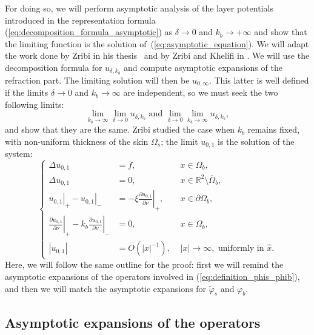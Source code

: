 \documentclass[final]{siamltex}
\numberwithin{equation}{section}
\numberwithin{figure}{section}
\numberwithin{table}{section}
\begin{document}
For doing so, we will perform asymptotic analysis of the layer
potentials introduced in the representation formula
(\ref{eq:decomposition_formula_asymptotic}) as $\delta \rightarrow
0$ and $k_b\rightarrow +\infty$ and show that the limiting
function is the solution of~(\ref{eq:asymptotic_equation}). We
will adapt the work done by Zribi in his thesis~\cite{zribilayer}
and by Zribi and Khelifi in \cite{khelifizribi}. We will use the
decomposition formula for $u_{\delta,k_{b}}$ and compute
asymptotic expansions of the refraction part. The limiting
solution will then be $u_{0,\infty}$. This latter is well defined
if the limits $\delta\rightarrow0$ and $k_{b}\rightarrow\infty$
are independent, so we must seek the two following limits:
\[
\lim_{k_{b}\rightarrow\infty}\lim_{\delta\rightarrow0}u_{\delta,k_{b}}\mbox{ and }\lim_{\delta\rightarrow0}\lim_{k_{b}\rightarrow\infty}u_{\delta,k_{b}},
\]
 and show that they are the same. Zribi \cite[chapter 3]{zribilayer}
studied the case when $k_{b}$ remains fixed, with non-uniform
thickness of the skin $\Omega_{s}$; the limit $u_{0,1}$ is the
solution of the system:
\begin{equation}
\left\{ \begin{alignedat}{2}\Delta u_{0,1} & ={f}, & \,\, x\in\Omega_{b},\\
\Delta u_{0,1} & =0, & \,\, x\in\mathbb{R}^{2}\setminus\overline{\Omega}_{b},\\
\left.u_{0,1}\right|_{+}-\left.u_{0,1}\right|_{-} & =-\xi\left.\frac{\partial u_{0,1}}{\partial\nu}\right|_{+}, & \,\, x\in\partial\Omega_{b},\\
\left.\frac{\partial u_{0,1}}{\partial\nu}\right|_{+}-k_{b}\left.\frac{\partial u_{0,1}}{\partial\nu}\right|_{-} & =0, & \,\, x\in\Omega_{b},\\
\left|u_{0,1}\right| & = {O}(\left|x\right|^{-1}), &
\,\,\left|x\right|\rightarrow\infty,\text{ uniformly in }\hat{x}.
\end{alignedat}
\right.\label{eq:asymptotic_equation_zribi}
\end{equation}
 Here, we will follow the same outline for the proof: first we will
remind the asymptotic expansions of the operators involved in
(\ref{eq:definition_phis_phib}), and then we will match the
asymptotic expansions for $\tilde{\varphi}_{s}$ and $\varphi_{b}$.


\subsection{Asymptotic expansions of the operators}
\end{document}
